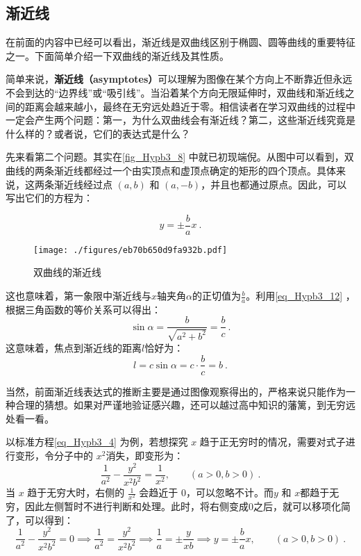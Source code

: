 \subsection{渐近线}

在前面的内容中已经可以看出，渐近线是双曲线区别于椭圆、圆等曲线的重要特征之一。下面简单介绍一下双曲线的渐近线及其性质。

简单来说，\textbf{渐近线（asymptotes）}可以理解为图像在某个方向上不断靠近但永远不会到达的“边界线”或“吸引线”。当沿着某个方向无限延伸时，双曲线和渐近线之间的距离会越来越小，最终在无穷远处趋近于零。相信读者在学习双曲线的过程中一定会产生两个问题：第一，为什么双曲线会有渐近线？第二，这些渐近线究竟是什么样的？或者说，它们的表达式是什么？

先来看第二个问题。其实在\autoref{fig_Hypb3_8} 中就已初现端倪。从图中可以看到，双曲线的两条渐近线都经过一个由实顶点和虚顶点确定的矩形的四个顶点。具体来说，这两条渐近线经过点 $(a,b)$ 和 $(a,-b)$，并且也都通过原点。因此，可以写出它们的方程为：

\begin{equation}\label{eq_Hypb3_16}
y=\pm\frac{b}{a}x~.
\end{equation}

\begin{figure}[ht]
\centering
\texttt{[image: ./figures/eb70b650d9fa932b.pdf]}
\caption{双曲线的渐近线} \label{fig_Hypb3_1}
\end{figure}

这也意味着，第一象限中渐近线与$x$轴夹角$\alpha$的正切值为$\displaystyle\frac{b}{a}$。利用\autoref{eq_Hypb3_12} ，根据三角函数的等价关系可以得出：
\begin{equation}
\sin\alpha=\frac{b}{\sqrt{a^2+b^2}}=\frac{b}{c}~.
\end{equation}
这意味着，焦点到渐近线的距离$l$恰好为：
\begin{equation}\label{eq_Hypb3_11}
l=c\sin\alpha = c\cdot \frac{b}{c} = b~.
\end{equation}

当然，前面渐近线表达式的推断主要是通过图像观察得出的，严格来说只能作为一种合理的猜想。如果对严谨地验证感兴趣，还可以越过高中知识的藩篱，到无穷远处看一看。

以标准方程\autoref{eq_Hypb3_4} 为例，若想探究 $x$ 趋于正无穷时的情况，需要对式子进行变形，令分子中的 $x^2$消失，即变形为：
\begin{equation}
\frac{1}{a^2} - \frac{y^2}{x^2b^2} =  \frac{1}{x^2} ,\qquad(a>0,b>0)~.
\end{equation}
当 $x$ 趋于无穷大时，右侧的 $\frac{1}{x^2}$ 会趋近于 $0$，可以忽略不计。而$y$ 和 $x$都趋于无穷，因此左侧暂时不进行判断和处理。此时，将右侧变成$0$之后，就可以移项化简了，可以得到：
\begin{equation}\label{eq_Hypb3_18}
\frac{1}{a^2} - \frac{y^2}{x^2b^2} = 0 \implies\frac{1}{a^2} = \frac{y^2}{x^2b^2}\implies \frac{1}{a} = \pm\frac{y}{xb}\implies y=\pm\frac{b}{a}x,\qquad(a>0,b>0)~.
\end{equation}

